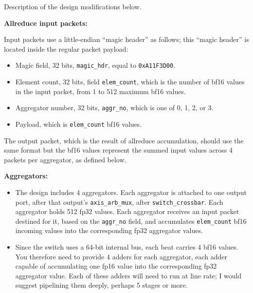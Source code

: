 \begin{tcolorbox}[
	colback=white,
	colframe=black,
	coltext=vrkblue,
	breakable,
	fontupper={\scriptsize\fontfamily{pcr}\selectfont},
	before upper={\RaggedRight}
	]
	\par\smallskip
	Description of the design modifications below.
	
	\par\smallskip
	\textbf{Allreduce input packets:}
	
	\par\smallskip
	Input packets use a little-endian ``magic header'' as follows; this ``magic header'' is located inside the regular packet payload:
	
	\begin{itemize}[leftmargin=*, topsep=2pt, itemsep=1pt]
		\item Magic field, 32 bits, \texttt{magic\_hdr}, equal to \texttt{0xA11F3D00}.
		\item Element count, 32 bits, field \texttt{elem\_count}, which is the number of bf16 values in the input packet, from 1 to 512 maximum bf16 values.
		\item Aggregator number, 32 bits, \texttt{aggr\_no}, which is one of 0, 1, 2, or 3.
		\item Payload, which is \texttt{elem\_count} bf16 values.
	\end{itemize}
	
	\par\smallskip
	The output packet, which is the result of allreduce accumulation, should use the same format but the bf16 values represent the summed input values across 4 packets per aggregator, as defined below.
	
	\par\smallskip
	\textbf{Aggregators:}
	
	\begin{itemize}[leftmargin=*, topsep=2pt, itemsep=1pt]
		\item The design includes 4 aggregators. Each aggregator is attached to one output port, after that output's \texttt{axis\_arb\_mux}, after \texttt{switch\_crossbar}. Each aggregator holds 512 fp32 values. Each aggregator receives an input packet destined for it, based on the \texttt{aggr\_no} field, and accumulates \texttt{elem\_count} bf16 incoming values into the corresponding fp32 aggregator values.
		
		\item Since the switch uses a 64-bit internal bus, each beat carries 4 bf16 values. You therefore need to provide 4 adders for each aggregator, each adder capable of accumulating one fp16 value into the corresponding fp32 aggregator value. Each of these adders will need to run at line rate; I would suggest pipelining them deeply, perhaps 5 stages or more.
		

\end{itemize}
\end{tcolorbox}
